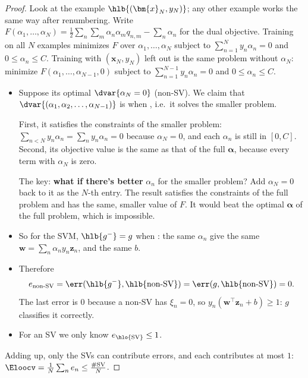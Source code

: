 \begin{proof}
    Look at the example \(\hlb{(\bm{x}_N, y_N)}\); any other example works
    the same way after renumbering. Write \(F(\alpha_1, \dots, \alpha_N) =
    \frac{1}{2} \sum_n \sum_m \alpha_n \alpha_m q_{n,m} - \sum_n \alpha_n\)
    for the dual objective. Training on all \(N\) examples minimizes \(F\)
    over \(\alpha_1, \dots, \alpha_N\) subject to \(\sum_{n=1}^N y_n \alpha_n
    = 0\) and \(0 \le \alpha_n \le C\). Training with \((\bm{x}_N, y_N)\) left
    out is the same problem without \(\alpha_N\): minimize \(F(\alpha_1,
    \dots, \alpha_{N-1}, 0)\) subject to \(\sum_{n=1}^{N-1} y_n \alpha_n = 0\)
    and \(0 \le \alpha_n \le C\).
    \begin{itemize}
        \item Suppose its optimal \(\dvar{\alpha_N = 0}\) (non-SV). We claim
            that \(\dvar{(\alpha_1, \alpha_2, \dots , \alpha_{N-1})}\) is
             when , i.e.\ it solves the smaller problem.

            First, it satisfies the constraints of the smaller problem:
            \(\sum_{n<N} y_n \alpha_n = \sum_n y_n \alpha_n = 0\) because
            \(\alpha_N = 0\), and each \(\alpha_n\) is still in \([0, C]\).
            Second, its objective value is the same as that of the full
            \(\bm{\alpha}\), because every term with \(\alpha_N\) is zero.

            The key: \textbf{what if there's better} \(\alpha_n\) for the
            smaller problem? Add \(\alpha_N = 0\) back to it as the
            \(N\)-th entry. The result satisfies the constraints of the full
            problem and has the same, smaller value of \(F\). It would beat
            the optimal \(\bm{\alpha}\) of the full problem, which is
            impossible.
        \item So for the SVM, \(\hlb{g^-} = g\) when : the same \(\alpha_n\) give the same \(\bm{w} = \sum_n
            \alpha_n y_n \bm{z}_n\), and the same \(b\).
        \item Therefore
            \[
                e_{\text{non-SV}} = \err(\hlb{g^-}, \hlb{\text{non-SV}}) =
                \err(g, \hlb{\text{non-SV}}) = 0.
            \]
            The last error is \(0\) because a non-SV has \(\xi_n = 0\), so
            \(y_n (\bm{w}^\top \bm{z}_n + b) \ge 1\): \(g\) classifies it
            correctly.
        \item For an SV we only know \(e_{\hlo{\text{SV}}} \le 1\).
    \end{itemize}
    Adding up, only the SVs can contribute errors, and each contributes at
    most \(1\): \(\Eloocv = \frac{1}{N} \sum_n e_n \le
    \frac{\#\text{SV}}{N}\).
\end{proof}

